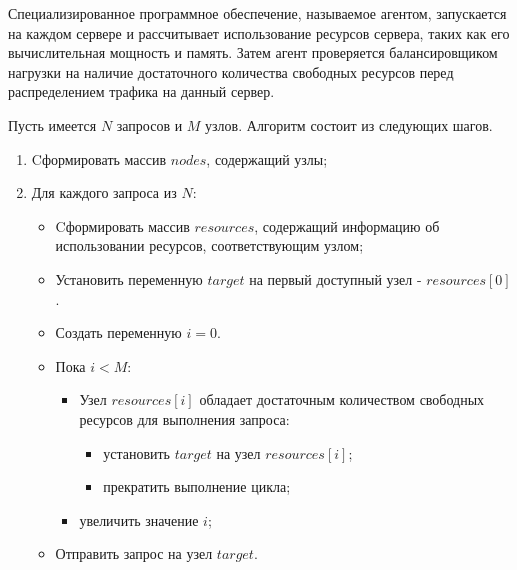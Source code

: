 Специализированное программное обеспечение, называемое агентом, запускается на каждом сервере и рассчитывает использование ресурсов сервера, таких как его вычислительная мощность и память. 
Затем агент проверяется балансировщиком нагрузки на наличие достаточного количества свободных ресурсов перед распределением трафика на данный сервер. \cite{whatislb}

Пусть имеется $N$ запросов и $M$ узлов. Алгоритм состоит из следующих шагов.

\begin{enumerate}
    \item Cформировать массив $nodes$, содержащий узлы;
    \item Для каждого запроса из $N$:
    \begin{itemize}
        \item Cформировать массив $resources$, содержащий информацию об использовании ресурсов, соответствующим узлом;
        \item Установить переменную $target$ на первый доступный узел - $resources[0]$.
	    \item Создать переменную $i = 0$.
        \item Пока $i < M$:
        \begin{itemize}
            \item Узел $resources[i]$ обладает достаточным количеством свободных ресурсов для выполнения запроса:
            \begin{itemize}
                \item установить $target$ на узел $resources[i]$; 
                \item прекратить выполнение цикла;
            \end{itemize}
		    \item увеличить значение $i$;
        \end{itemize}
        \item Отправить запрос на узел $target$.
	\end{itemize}
\end{enumerate}